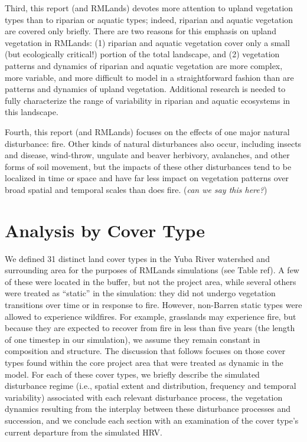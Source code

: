 Third, this report (and RMLands) devotes more attention to upland vegetation types than to riparian or aquatic types; indeed, riparian and aquatic vegetation are covered only briefly. There are two reasons for this emphasis on upland vegetation in RMLands: (1) riparian and aquatic vegetation cover only a small (but ecologically critical!) portion of the total landscape, and (2) vegetation patterns and dynamics of riparian and aquatic vegetation are more complex, more variable, and more difficult to model in a straightforward fashion than are patterns and dynamics of upland vegetation. Additional research is needed to fully characterize the range of variability in riparian and aquatic ecosystems in this landscape. 

Fourth, this report (and RMLands) focuses on the effects of one major natural disturbance: fire. Other kinds of natural disturbances also occur, including insects and disease, wind-throw, ungulate and beaver herbivory, avalanches, and other forms of soil movement, but the impacts of these other disturbances tend to be localized in time or space and have far less impact on vegetation patterns over broad spatial and temporal scales than does fire. (\emph{can we say this here?})

\section{Analysis by Cover Type}
We defined 31 distinct land cover types in the Yuba River watershed and surrounding area for the purposes of RMLands simulations (see Table ref{}). A few of these were located in the buffer, but not the project area, while several others were treated as ``static'' in the simulation: they did not undergo vegetation transitions over time or in response to fire. However, non-Barren static types were allowed to experience wildfires. For example, grasslands may experience fire, but because they are expected to recover from fire in less than five years (the length of one timestep in our simulation), we assume they remain constant in composition and structure. The discussion that follows focuses on those cover types found within the core project area that were treated as dynamic in the model. For each of these cover types, we briefly describe the simulated disturbance regime (i.e., spatial extent and distribution, frequency and temporal variability) associated with each relevant disturbance process, the vegetation dynamics resulting from the interplay between these disturbance processes and succession, and we conclude each section with an examination of the cover type’s current departure from the simulated HRV. 

